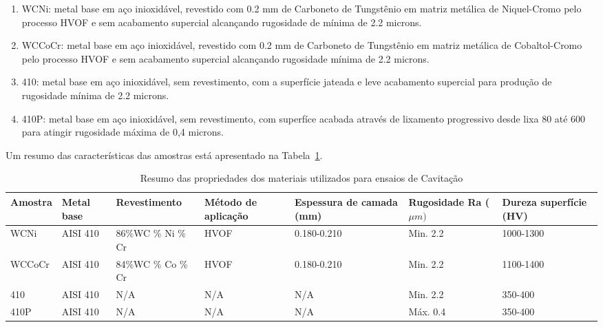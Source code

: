 \begin{enumerate}
  \item WCNi: metal base em aço inioxidável, revestido com 0.2 mm de Carboneto  
  de Tungstênio em   matriz metálica de Niquel-Cromo pelo processo HVOF e sem
  acabamento supercial alcançando rugosidade de mínima de 2.2 microns.
  \item WCCoCr: metal base em aço inioxidável, revestido com 0.2 mm de
  Carboneto de Tungstênio em   matriz metálica de Cobaltol-Cromo pelo processo
  HVOF e sem acabamento supercial alcançando rugosidade mínima de 2.2 microns.
  \item 410: metal base em aço inioxidável, sem revestimento, com a superfície
  jateada e leve  acabamento supercial para produção de rugosidade mínima de
  2.2 microns.
  \item 410P: metal base em aço inioxidável, sem revestimento, com superfíce
  acabada através de lixamento progressivo desde lixa 80 até 600 para atingir
  rugosidade máxima de 0,4 microns.
\end{enumerate}
 
 Um resumo das características das amostras está apresentado na
 Tabela~\ref{tab:cav_hvof}.
 
 \begin{table}[]
\centering
\caption{Resumo das propriedades dos materiais utilizados para ensaios de Cavitação}
\label{tab:cav_hvof}
\begin{tabular}{p{1.5cm}p{1.5cm}p{2.2cm}p{1.7cm}p{1.8cm}p{1.8cm}p{1.8cm}}
\hline
Amostra & Metal base & Revestimento & Método de aplicação & Espessura de camada
(mm) & Rugosidade Ra ($\mu m)$ & Dureza superfície (HV)\\ \hline 
WCNi   & AISI 410 & 86\%WC \newline 13\% Ni \newline 3\% Cr & HVOF  &
0.180-0.210  & Min.
2.2  & 1000-1300\\ \hline WCCoCr & AISI 410 & 84\%WC \newline 10\% Co \newline
4\% Cr & HVOF  & 0.180-0.210 & Min. 2.2  & 1100-1400\\ \hline 410    & AISI 410 & N/A               & N/A   & N/A          & Min. 2.2  & 350-400  \\ \hline 
410P   & AISI 410 & N/A               & N/A   & N/A          & Máx. 0.4  & 350-400\\ \hline
\end{tabular}
\end{table}

